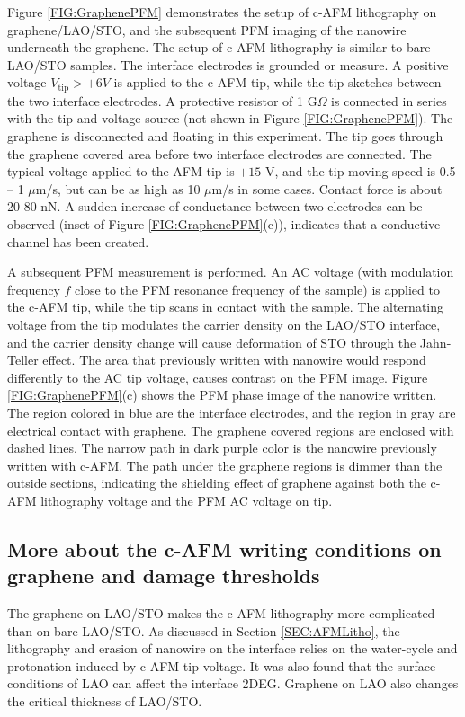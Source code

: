 \documentclass[pdflatex, sectionletters, 12pt]{pittetd}    %
\begin{document}
Figure \ref{FIG:GraphenePFM} demonstrates the setup of c-AFM lithography on graphene/LAO/STO, and the subsequent PFM imaging of the nanowire underneath the graphene. The setup of c-AFM lithography is similar to bare LAO/STO samples. The interface electrodes is grounded or measure. A positive voltage $V_\mathrm{tip} > +6V$ is applied to the c-AFM tip, while the tip sketches between the two interface electrodes. A protective resistor of 1 G$\Omega$ is connected in series with the tip and voltage source (not shown in Figure \ref{FIG:GraphenePFM}). The graphene is disconnected and floating in this experiment. The tip goes through the graphene covered area before two interface electrodes are connected. The typical voltage applied to the AFM tip is $+15$ V, and the tip moving speed is 0.5 -- 1 $\mu$m/s, but can be as high as 10 $\mu$m/s in some cases. Contact force is about 20-80 nN. A sudden increase of conductance between two electrodes can be observed (inset of Figure \ref{FIG:GraphenePFM}(c)), indicates that a conductive channel has been created. 

A subsequent PFM measurement is performed. An AC voltage (with modulation frequency $f$ close to the PFM resonance frequency of the sample) is applied to the c-AFM tip, while the tip scans in contact with the sample. The alternating voltage from the tip modulates the carrier density on the LAO/STO interface, and the carrier density change will cause deformation of STO through the Jahn-Teller effect\cite{}. The area that previously written with nanowire would respond differently to the AC tip voltage, causes contrast on the PFM image. Figure \ref{FIG:GraphenePFM}(c) shows the PFM phase image of the nanowire written. The region colored in blue are the interface electrodes, and the region in gray are electrical contact with graphene. The graphene covered regions are enclosed with dashed lines. The narrow path in dark purple color is the nanowire previously written with c-AFM. The path under the graphene regions is dimmer than the outside sections, indicating the shielding effect of graphene against both the c-AFM lithography voltage and the PFM AC voltage on tip.


\subsection{More about the c-AFM writing conditions on graphene and damage thresholds}

The graphene on LAO/STO makes the c-AFM lithography more complicated than on bare LAO/STO. As discussed in Section \ref{SEC:AFMLitho}, the lithography and erasion of nanowire on the interface relies on the water-cycle and protonation induced by c-AFM tip voltage. It was also found that the surface conditions of LAO can affect the interface 2DEG\cite{}. Graphene on LAO also changes the critical thickness of LAO/STO\cite{aliaj2018probing}. 
\\
\end{document}
